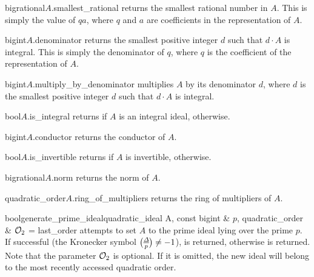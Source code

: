 \begin{cfcode}{bigrational}{$A$.smallest_rational}{}
  returns the smallest rational number in $A$.  This is simply the value of $qa$, where $q$ and
  $a$ are coefficients in the representation of $A$.
\end{cfcode}

\begin{cfcode}{bigint}{$A$.denominator}{}
  returns the smallest positive integer $d$ such that $d \cdot A$ is integral. This is simply
  the denominator of $q$, where $q$ is the coefficient of the representation of $A$.
\end{cfcode}

\begin{cfcode}{bigint}{$A$.multiply_by_denominator}{}
  multiplies $A$ by its denominator $d$, where $d$ is the smallest positive integer $d$ such
  that $d \cdot A$ is integral.
\end{cfcode}

\begin{cfcode}{bool}{$A$.is_integral}{}
  returns \TRUE if $A$ is an integral ideal, \FALSE otherwise.
\end{cfcode}

\begin{cfcode}{bigint}{$A$.conductor}{}
  returns the conductor of $A$.
\end{cfcode}

\begin{cfcode}{bool}{$A$.is_invertible}{}
  returns \TRUE if $A$ is invertible, \FALSE otherwise.
\end{cfcode}

\begin{cfcode}{bigrational}{$A$.norm}{}
  returns the norm of $A$.
\end{cfcode}

\begin{fcode}{quadratic_order}{$A$.ring_of_multipliers}{}
  returns the ring of multipliers of $A$.
\end{fcode}

\begin{fcode}{bool}{generate_prime_ideal}{quadratic_ideal A, const bigint & $p$,
    quadratic_order & $\mathcal{O}_2$ = last_order}%
  attempts to set $A$ to the prime ideal lying over the prime $p$.  If successful (the Kronecker
  symbol $\kronecker{\D}{p} \neq -1$), \TRUE is returned, otherwise \FALSE is returned.  Note
  that the parameter $\mathcal{O}_2$ is optional.  If it is omitted, the new ideal will belong to the
  most recently accessed quadratic order.
\end{fcode}


